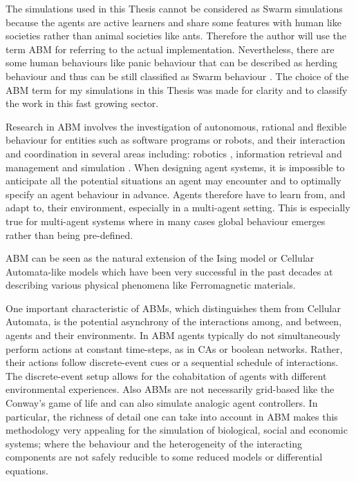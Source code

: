 The simulations used in this Thesis cannot be considered as Swarm simulations because
the agents are active learners and share some features with human like societies
rather than animal societies like ants.
Therefore the author will use the term ABM for referring to the actual implementation.
Nevertheless, there are some human behaviours like panic behaviour that can be
described as herding behaviour and thus can be still classified as Swarm behaviour
\citep{Bonomi2009:PedestrianDynamic,Georgoudas2006:PedestrianEvacuation,Kirchner2002:CASim,
Varas2007:CAevacuation,Zong2010:MultiObjAnt}.
The choice of the ABM term for my simulations in this Thesis was made for clarity
and to classify the work in this fast growing sector.

Research in ABM involves the investigation of autonomous, rational and flexible
behaviour for entities such as software programs or robots, and their interaction and
coordination in several areas including: robotics \citep{Kitano1997},
information retrieval and management \citep{IntroMultiAgent1,IntroMultiAgent2}
 and simulation \citep{GilbertConte1995:AIsocieties}. When designing agent systems, it is
impossible to anticipate all the potential situations an agent may encounter and to optimally
specify an agent behaviour in advance. Agents therefore have to learn from,
and adapt to, their environment, especially in a multi-agent setting.
This is especially true for multi-agent systems where in many cases global behaviour
emerges rather than being pre-defined.

ABM can be seen as the natural extension of the Ising model \citep{Ernst1925:Model} or
Cellular Automata-like models \citep{Wolfram1994:CellAutomata} which have been very successful
in the past decades at describing various physical phenomena like Ferromagnetic materials.

One important characteristic of ABMs, which distinguishes them from Cellular Automata,
is the potential asynchrony of the interactions among, and between, agents and
their environments. In ABM agents typically do not simultaneously perform actions at
constant time-steps, as in CAs or boolean networks. Rather, their actions follow
discrete-event cues or a sequential schedule of interactions. The discrete-event
setup allows for the cohabitation of agents with different environmental experiences.
Also ABMs are not necessarily grid-based like the Conway's game of life \citep{Gardner1970:GameLife} 
and can also simulate analogic agent controllers.
In particular, the richness of detail one can take into account in ABM makes
this methodology very appealing for the simulation of biological, social and
economic systems; where the behaviour and the heterogeneity of the interacting
components are not safely reducible to some reduced models or differential equations.

